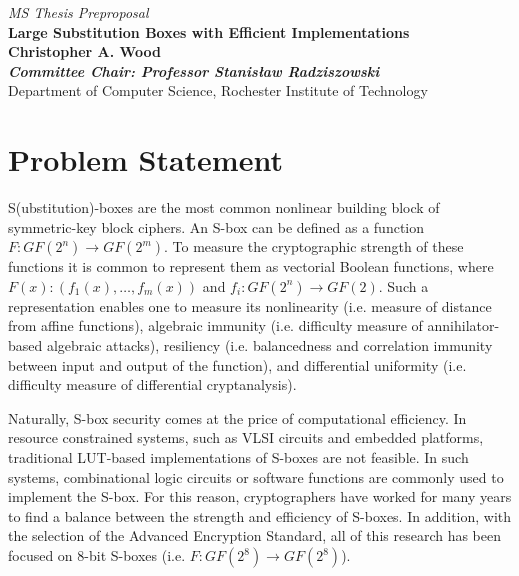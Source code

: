 \documentclass[10pt]{article}
\begin{document}
\thispagestyle{empty} 
\begin{center}
{\em MS Thesis Preproposal}\\
{\large \bf Large Substitution Boxes with Efficient Implementations}\\
{\bf Christopher A. Wood}\\
{\bf \it Committee Chair: Professor Stanis{\l}aw Radziszowski}\\
Department of Computer Science, Rochester Institute of Technology\\
\end{center}

\vspace{-1em}
\section{Problem Statement}
S(ubstitution)-boxes are the most common nonlinear building block of symmetric-key
block ciphers. An S-box can be defined as a function $F : GF(2^n) \to GF(2^m)$. To measure
the cryptographic strength of these functions it is common to represent them as vectorial Boolean functions,
where $F(x) : (f_1(x), \dots, f_m(x))$ and $f_i : GF(2^n) \to GF(2)$. Such a representation
enables one to measure its nonlinearity (i.e. measure of distance from affine functions), algebraic
immunity (i.e. difficulty measure of annihilator-based algebraic attacks), resiliency (i.e. balancedness 
and correlation immunity between input and output of the function), and differential uniformity (i.e.
difficulty measure of differential cryptanalysis).

Naturally, S-box security comes at the price of computational efficiency.
In resource constrained systems, such as VLSI circuits and embedded platforms, traditional LUT-based
implementations of S-boxes are not feasible. In such systems, 
combinational logic circuits or software functions are commonly used to implement the S-box.
For this reason, cryptographers have worked for many years to find a balance between the strength
and efficiency of S-boxes. In addition, with the selection of the Advanced Encryption Standard,
all of this research has been focused on 8-bit S-boxes (i.e. $F : GF(2^8) \to GF(2^8)$).
\end{document}

